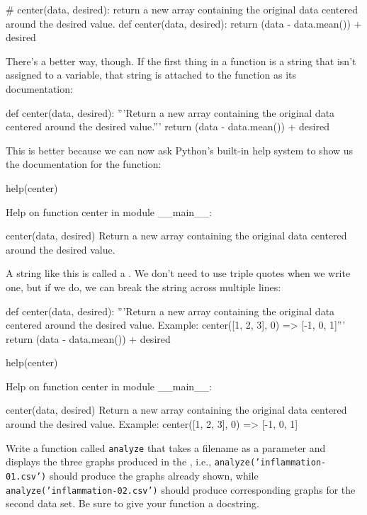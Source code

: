 \documentclass{book}
\begin{document}
\begin{VerbIn}
# center(data, desired): return a new array containing the original data centered around the desired value.
def center(data, desired):
    return (data - data.mean()) + desired
\end{VerbIn}

There's a better way, though. If the first thing in a function is a
string that isn't assigned to a variable, that string is attached to the
function as its documentation:

\begin{VerbIn}
def center(data, desired):
    '''Return a new array containing the original data centered around the desired value.'''
    return (data - data.mean()) + desired
\end{VerbIn}

This is better because we can now ask Python's built-in help system to
show us the documentation for the function:

\begin{VerbIn}
help(center)
\end{VerbIn}

\begin{VerbOut}
Help on function center in module __main__:

center(data, desired)
    Return a new array containing the original data centered around the desired value.
\end{VerbOut}

A string like this is called a . We
don't need to use triple quotes when we write one, but if we do, we can
break the string across multiple lines:

\begin{VerbIn}
def center(data, desired):
    '''Return a new array containing the original data centered around the desired value.
    Example: center([1, 2, 3], 0) => [-1, 0, 1]'''
    return (data - data.mean()) + desired

help(center)
\end{VerbIn}

\begin{VerbOut}
Help on function center in module __main__:

center(data, desired)
    Return a new array containing the original data centered around the desired value.
    Example: center([1, 2, 3], 0) => [-1, 0, 1]
\end{VerbOut}

\begin{challenge}
  Write a function called \texttt{analyze} that takes a filename as a
  parameter and displays the three graphs produced in the
  , i.e.,
  \texttt{analyze('inflammation-01.csv')} should produce the graphs
  already shown, while \texttt{analyze('inflammation-02.csv')} should
  produce corresponding graphs for the second data set. Be sure to give
  your function a docstring.
\end{challenge}
\end{document}
